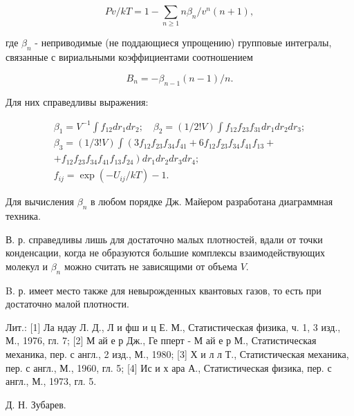\documentclass[10pt]{article}
\begin{document}
\[

P v / k T=1-\sum_{n \geqslant 1} n \beta_{n} / v^{n}(n+1),

\]



где $\beta_{n}$ - неприводимые (не поддающиеся упрощению) групповые интегралы, связанные с вириальными коэффициентами соотношением



\[

B_{n}=-\beta_{n-1}(n-1) / n .

\]



Для них справедливы выражения:



\[

\begin{gathered}

\beta_{1}=V^{-1} \int f_{12} d r_{1} d r_{2} ; \quad \beta_{2}=(1 / 2 ! V) \int f_{12} f_{23} f_{31} d r_{1} d r_{2} d r_{3} ; \\

\beta_{3}=(1 / 3 ! V) \int\left(3 f_{12} f_{23} f_{34} f_{41}+6 f_{12} f_{23} f_{34} f_{41} f_{13}+\right. \\

\left.+f_{12} f_{23} f_{34} f_{41} f_{13} f_{24}\right) d r_{1} d r_{2} d r_{3} d r_{4} ; \\

f_{i j}=\exp \left(-U_{i j} / k T\right)-1 .

\end{gathered}

\]



Для вычисления $\beta_{n}$ в любом порядке Дж. Майером разработана диаграммная техника.



В. р. справедливы лишь для достаточно малых плотностей, вдали от точки конденсации, когда не образуются большие комплексы взаимодействующих молекул и $\beta_{n}$ можно считать не зависящими от объема $V$.



B. р. имеет место также для невырожденных квантовых газов, то есть при достаточно малой плотности.



Лит.: [1] Ла ндау Л. Д., Л и фш и ц Е. М., Статистическая физика, ч. 1, 3 изд., М., 1976, гл. 7; [2] М ай е р Дж., Ге пперт - М ай е р М., Статистическая механика, пер. с англ., 2 изд., М., 1980; [3] Х и л л Т., Статистическая механика, пер. с англ., М., 1960, гл. 5; [4] Ис и х ара А., Статистическая физика, пер. с англ., М., 1973, гл. 5.



Д. Н. Зубарев.
\end{document}
